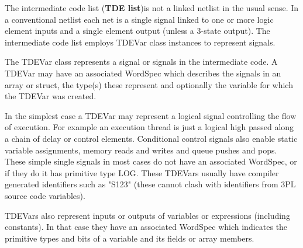         The intermediate code list ({\bf TDE list})is not a linked netlist in
        the usual sense. In a conventional netlist each net is a single signal
        linked to one or more logic element inputs and a single element output
        (unless a 3-state output). The intermediate code list employs TDEVar
        class instances to represent signals.

        The TDEVar class represents a signal or signals in the intermediate
        code. A TDEVar may have an associated WordSpec which describes the
        signals in an array or struct, the type(s) these represent and
        optionally the variable for which the TDEVar was created.

        In the simplest case a TDEVar may represent a logical signal controlling
        the flow of execution. For example an execution thread is just a logical
        high passed along a chain of delay or control elements. Conditional
        control signals also enable static variable assignments, memory reads
        and writes and queue pushes and pops. These simple single signals in
        most cases do not have an associated WordSpec, or if they do it has
        primitive type LOG. These TDEVars usually have compiler generated
        identifiers such as "S123" (these cannot clash with identifiers from 3PL
        source code variables).

        TDEVars also represent inputs or outputs of variables or expressions
        (including constants). In that case they have an associated WordSpec
        which indicates the primitive types and bits of a variable and its
        fields or array members.

